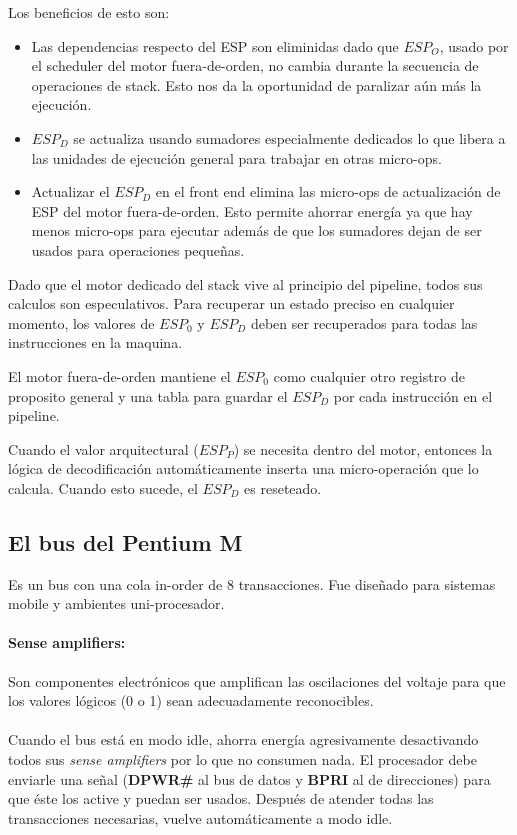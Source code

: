 Los beneficios de esto son:

\begin{itemize}
	\item Las dependencias respecto del ESP son eliminidas dado que $ESP_O$, usado por el scheduler del motor fuera-de-orden, no cambia durante la secuencia de operaciones de stack. Esto nos da la oportunidad de paralizar aún más la ejecución.
	
	\item $ESP_D$ se actualiza usando sumadores especialmente dedicados lo que libera a las unidades de ejecución general para trabajar en otras micro-ops.
	
	\item Actualizar el $ESP_D$ en el front end elimina las micro-ops de actualización de ESP del motor fuera-de-orden. Esto permite ahorrar energía ya que hay menos micro-ops para ejecutar además de que los sumadores dejan de ser usados para operaciones pequeñas.
\end{itemize}

Dado que el motor dedicado del stack vive al principio del pipeline, todos sus calculos son especulativos. Para recuperar un estado preciso en cualquier momento, los valores de $ESP_0$ y $ESP_D$ deben ser recuperados para todas las instrucciones en la maquina. 

El motor fuera-de-orden mantiene el $ESP_0$ como cualquier otro registro de proposito general y una tabla para guardar el $ESP_D$ por cada instrucción en el pipeline.

Cuando el valor arquitectural ($ESP_P$) se necesita dentro del motor, entonces la lógica de decodificación automáticamente inserta una micro-operación que lo calcula. Cuando esto sucede, el $ESP_D$ es reseteado.

\subsection{El bus del Pentium M}
Es un bus con una cola in-order de 8 transacciones. Fue diseñado para sistemas mobile y ambientes uni-procesador.

\paragraph{Sense amplifiers:} Son componentes electrónicos que amplifican las oscilaciones del voltaje para que los valores lógicos (0 o 1) sean adecuadamente reconocibles.

\paragraph{}
Cuando el bus está en modo idle, ahorra energía agresivamente desactivando todos sus \textit{sense amplifiers} por lo que no consumen nada. El procesador debe enviarle una señal (\textbf{DPWR\#} al bus de datos y \textbf{BPRI} al de direcciones) para que éste los active y puedan ser usados. Después de atender todas las transacciones necesarias, vuelve automáticamente a modo idle.

